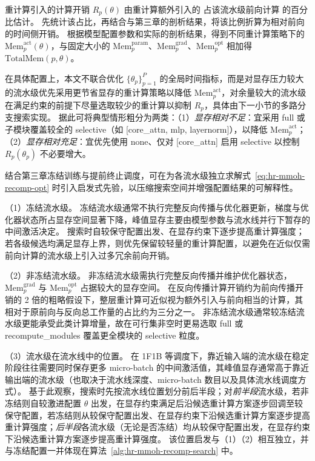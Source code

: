 重计算引入的计算开销 $R_p(\theta)$ 由重计算额外引入的  占该流水级前向计算  的百分比估计。
先统计该占比，再结合与第三章的剖析结果，将该比例折算为相对前向的时间侧开销。
根据模型配置参数和实际的剖析结果，得到不同重计算策略下的 $\mathrm{Mem}_p^{\mathrm{act}}(\theta)$，与固定大小的 $\mathrm{Mem}_p^{\mathrm{param}}$、$\mathrm{Mem}_p^{\mathrm{grad}}$、$\mathrm{Mem}_p^{\mathrm{opt}}$ 相加得 $\mathrm{TotalMem}(p,\theta)$。

在具体配置上，本文不联合优化 $\{\theta_p\}_{p=1}^{P}$ 的全局时间指标，而是对显存压力较大的流水级优先采用更节省显存的重计算策略以降低 $\mathrm{Mem}_p^{\mathrm{act}}$，对余量较大的流水级在满足约束的前提下尽量选取较少的重计算以抑制 $R_p$，具体由下一小节的多路分支搜索实现。
据此可将典型情形粗分为两类：（1）\emph{显存相对不足}：宜采用 full 或子模块覆盖较全的 selective（如 [core\_attn, mlp, layernorm]），以降低 $\mathrm{Mem}_p^{\mathrm{act}}$；（2）\emph{显存相对充足}：宜优先使用 none、仅对 [core\_attn] 启用 selective 以控制 $R_p(\theta_p)$ 不必要增大。

结合第三章冻结训练与提前终止调度，可在为各流水级独立求解式~\eqref{eq:hr-mmoh-recomp-opt} 时引入启发式先验，以压缩搜索空间并增强配置结果的可解释性。

（1）冻结流水级。
冻结流水级通常不执行完整反向传播与优化器更新，梯度与优化器状态所占显存空间显著下降，峰值显存主要由模型参数与流水线并行下暂存的中间激活决定。
搜索时自较保守配置出发、在显存约束下逐步提高重计算强度；若各级候选均满足显存上界，则优先保留较轻量的重计算配置，以避免在近似仅需前向计算的流水级上引入过多冗余前向开销。

（2）非冻结流水级。
非冻结流水级需执行完整反向传播并维护优化器状态，$\mathrm{Mem}_p^{\mathrm{grad}}$ 与 $\mathrm{Mem}_p^{\mathrm{opt}}$ 占据较大的显存空间。
在反向传播计算开销约为前向传播开销的 2 倍的粗略假设下\cite{zerobubble2024}，整层重计算可近似视为额外引入与前向相当的计算，其相对于原前向与反向总工作量的占比约为三分之一。
非冻结流水级通常较冻结流水级更能承受此类计算增量，故在可行集非空时更易选取 full 或 recompute\_modules 覆盖更全模块的 selective 粒度。

（3）流水级在流水线中的位置。
在 1F1B 等调度下，靠近输入端的流水级在稳定阶段往往需要同时保存更多 micro-batch 的中间激活值，其峰值显存通常高于靠近输出端的流水级（也取决于流水线深度、micro-batch 数目以及具体流水线调度方式）。
基于此观察，搜索时先按流水线位置划分前后半段；对\emph{前半段}流水级，若非冻结则自较激进配置 $\theta$ 出发，在显存约束满足后沿候选重计算方案逐步回调至较保守配置，若冻结则从较保守配置出发、在显存约束下沿候选重计算方案逐步提高重计算强度；\emph{后半段}各流水级（无论是否冻结）均从较保守配置出发，在显存约束下沿候选重计算方案逐步提高重计算强度。
该位置启发与（1）（2）相互独立，并与冻结配置一并体现在算法~\ref{alg:hr-mmoh-recomp-search} 中。

